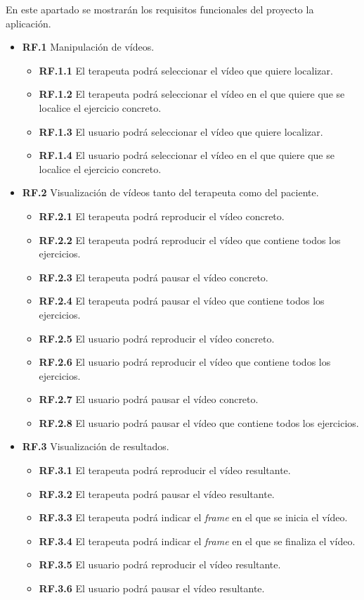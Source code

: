 En este apartado se mostrarán los requisitos funcionales del proyecto la aplicación.
\begin{itemize}
	\item \textbf{RF.1} Manipulación de vídeos. 
	\begin{itemize}
	\item \textbf{RF.1.1} El terapeuta podrá seleccionar el vídeo que quiere localizar.
	\item \textbf{RF.1.2} El terapeuta podrá seleccionar el vídeo en el que quiere que se localice el ejercicio concreto. 
	\item \textbf{RF.1.3} El usuario podrá seleccionar el vídeo que quiere localizar.
	\item \textbf{RF.1.4} El usuario podrá seleccionar el vídeo en el que quiere que se localice el ejercicio concreto.
	\end{itemize}
	
	\item \textbf{RF.2} Visualización de vídeos tanto del terapeuta como del paciente.
	\begin{itemize}
	\item \textbf{RF.2.1} El terapeuta podrá reproducir el vídeo concreto.
	\item \textbf{RF.2.2} El terapeuta podrá reproducir el vídeo que contiene todos los ejercicios.
	\item \textbf{RF.2.3} El terapeuta podrá pausar el vídeo concreto.
	\item \textbf{RF.2.4} El terapeuta podrá pausar el vídeo que contiene todos los ejercicios.
	\item \textbf{RF.2.5} El usuario podrá reproducir el vídeo concreto.
	\item \textbf{RF.2.6} El usuario podrá reproducir el vídeo que contiene todos los ejercicios.
	\item \textbf{RF.2.7} El usuario podrá pausar el vídeo concreto.
	\item \textbf{RF.2.8} El usuario podrá pausar el vídeo que contiene todos los ejercicios.
	\end{itemize}
	
	\item \textbf{RF.3} Visualización de resultados.
	\begin{itemize}
	\item \textbf{RF.3.1} El terapeuta podrá reproducir el vídeo resultante.
	\item \textbf{RF.3.2} El terapeuta podrá pausar el vídeo resultante.
	\item \textbf{RF.3.3} El terapeuta podrá indicar el \textit{frame} en el que se inicia el vídeo.
	\item \textbf{RF.3.4} El terapeuta podrá indicar el \textit{frame} en el que se finaliza el vídeo.
	\item \textbf{RF.3.5} El usuario podrá reproducir el vídeo resultante.
	\item \textbf{RF.3.6} El usuario podrá pausar el vídeo resultante.
	\end{itemize}
	

\end{itemize}

